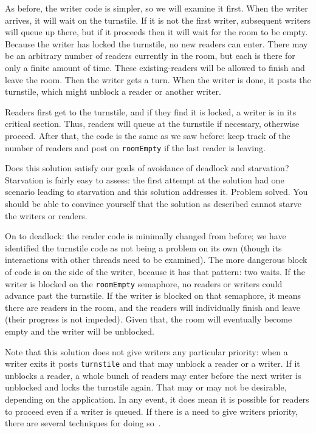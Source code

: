 As before, the writer code is simpler, so we will examine it first. When the writer arrives, it will wait on the turnstile. If it is not the first writer, subsequent writers will queue up there, but if it proceeds then it will wait for the room to be empty. Because the writer has locked the turnstile, no new readers can enter. There may be an arbitrary number of readers currently in the room, but each is there for only a finite amount of time. These existing-readers will be allowed to finish and leave the room. Then the writer gets a turn. When the writer is done, it posts the turnstile, which might unblock a reader or another writer.

Readers first get to the turnstile, and if they find it is locked, a writer is in its critical section. Thus, readers will queue at the turnstile if necessary, otherwise proceed. After that, the code is the same as we saw before: keep track of the number of readers and post on \texttt{roomEmpty} if the last reader is leaving.

Does this solution satisfy our goals of avoidance of deadlock and starvation? Starvation is fairly easy to assess: the first attempt at the solution had one scenario leading to starvation and this solution addresses it. Problem solved. You should be able to convince yourself that the solution as described cannot starve the writers or readers.

On to deadlock: the reader code is minimally changed from before; we have identified the turnstile code as not being a problem on its own (though its interactions with other threads need to be examined). The more dangerous block of code is on the side of the writer, because it has that pattern: two waits. If the writer is blocked on the \texttt{roomEmpty} semaphore, no readers or writers could advance past the turnstile. If the writer is blocked on that semaphore, it means there are readers in the room, and the readers will individually finish and leave (their progress is not impeded). Given that, the room will eventually become empty and the writer will be unblocked.


Note that this solution does not give writers any particular priority: when a writer exits it posts \texttt{turnstile} and that may unblock a reader or a writer. If it unblocks a reader, a whole bunch of readers may enter before the next writer is unblocked and locks the turnstile again. That may or may not be desirable, depending on the application. In any event, it does mean it is possible for readers to proceed even if a writer is queued. If there is a need to give writers priority, there are several techniques for doing so~\cite{lbs}.


